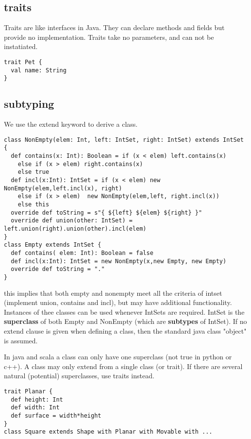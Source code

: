 \subsection{traits}
Traits are like interfaces in Java. They can declare methods and fields but provide no implementation. Traits take no parameters, and can not be instatiated. 
\begin{lstlisting}
trait Pet {
  val name: String
}
\end{lstlisting}

\subsection{subtyping}
We use the extend keyword to derive a class.
\begin{lstlisting}
class NonEmpty(elem: Int, left: IntSet, right: IntSet) extends IntSet {
  def contains(x: Int): Boolean = if (x < elem) left.contains(x)
    else if (x > elem) right.contains(x)
    else true
  def incl(x:Int): IntSet = if (x < elem) new NonEmpty(elem,left.incl(x), right)
    else if (x > elem)  new NonEmpty(elem,left, right.incl(x))
    else this
  override def toString = s"{ ${left} ${elem} ${right} }"
  override def union(other: IntSet) = left.union(right).union(other).incl(elem)
}
class Empty extends IntSet {
  def contains( elem: Int): Boolean = false
  def incl(x:Int): IntSet = new NonEmpty(x,new Empty, new Empty)
  override def toString = "."
}
\end{lstlisting}
this implies that both empty and nonempty meet all the criteria of intset (implement union, contains and incl), but may have additional functionality. Instances of thee classes can be used whenever IntSets are required. IntSet is the {\bf superclass} of both Empty and NonEmpty (which are {\bf subtypes} of IntSet). If no extend clause is given when defining a class, then the standard java class "object" is assumed. 

In java and scala a class can only have one superclass (not true in python or c++). A class may only extend from a single class (or trait). If there are several natural (potential) superclasses, use traits instead.
\begin{lstlisting}
trait Planar {
  def height: Int
  def width: Int
  def surface = width*height
}
class Square extends Shape with Planar with Movable with ...
\end{lstlisting}


